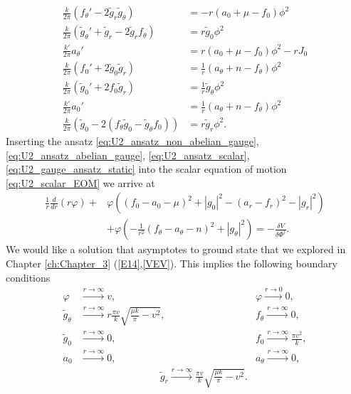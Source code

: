     \begin{align}
        \frac{k}{2 \pi } \left(f_{\theta}' - 2\tilde{g}_r \tilde{g}_{\theta}\right) &= -r \left(a_0 + \mu - f_0\right) \phi^2\\
        \frac{k}{2 \pi} \left(\tilde{g}_{\theta}' + \tilde{g}_r - 2 \tilde{g}_r f_{\theta} \right) & = r\tilde{g}_0 \phi^2 \\
        \frac{k'}{2 \pi} a_{\theta}' &= r \left(a_0 +\mu - f_0 \right)\phi^2 - rJ_0 \\
        \frac{k}{2\pi} \left(f_0'+2 \tilde{g}_0\tilde{g}_r\right) &= \frac{1}{r} \left(a_{\theta}+n - f_{\theta}\right)\phi^2 \\
        \frac{k}{2\pi}\left(\tilde{g}_0' + 2 f_0 \tilde{g}_r \right) &=\frac{1}{r} \tilde{g}_{\theta}\phi^2 \\
        \frac{k'}{2\pi} a_0'&= \frac{1}{r} \left(a_{\theta}+n - f_{\theta}\right) \phi^2 \\
        \frac{k}{2\pi} \left(\tilde{g}_0 - 2\left(f_{\theta} \tilde{g}_0 - \tilde{g}_{\theta} f_0\right)\right) &= r \tilde{g}_r \phi^2.
    \end{align}
Inserting the ansatz \ref{eq:U2_ansatz_non_abelian_gauge}, \ref{eq:U2_ansatz_abelian_gauge}, \ref{eq:U2_ansatz_scalar}, \ref{eq:U2_gauge_ansatz_static} into the scalar equation of motion \ref{eq:U2_scalar_EOM} we arrive at
\begin{align}
    \frac{1}{r} \frac{d}{dr} \left(r \varphi\right)+ &\varphi \left( \left(f_0 -a_0 -\mu\right)^2 + |g_0|^2 - \left(a_r -f_r\right)^2 - |g_r|^2 \right)\nonumber \\
    &+ \varphi \left(-\frac{1}{r^2} \left(f_{\theta} - a_{\theta} -n\right)^2 +|g_{\theta}|^2 \right) = - \frac{\delta V}{\delta \Phi^{\dag}}.
\end{align}
We would like a solution that asymptotes to ground state that we explored in Chapter \ref{ch:Chapter_3} (\eqref{E14},\eqref{VEV}). This implies the following boundary conditions
\begin{align}
    \varphi &\xrightarrow{r \rightarrow \infty} v, \qquad \qquad \qquad & \varphi \xrightarrow{r \rightarrow 0} 0,\\
    \tilde{g}_{\theta} &\xrightarrow{r \rightarrow \infty} r \frac{\pi v}{k} \sqrt{ \frac{\mu k}{\pi} -v^2}, &f_{\theta} \xrightarrow{r \rightarrow \infty}0,\\ 
    \tilde{g}_0 &\xrightarrow{r \rightarrow \infty} 0, &f_0  \xrightarrow{r \rightarrow \infty}\frac{\pi v^2}{k},\\
     a_0 &\xrightarrow{r \rightarrow \infty} 0, &a_{\theta} \xrightarrow{r \rightarrow \infty} 0,\\
    & \qquad\qquad\qquad\qquad  \tilde{g}_r \xrightarrow{r \rightarrow \infty} \frac{\pi v}{k} \sqrt{ \frac{\mu k}{\pi} -v^2}.  & 
\end{align}




